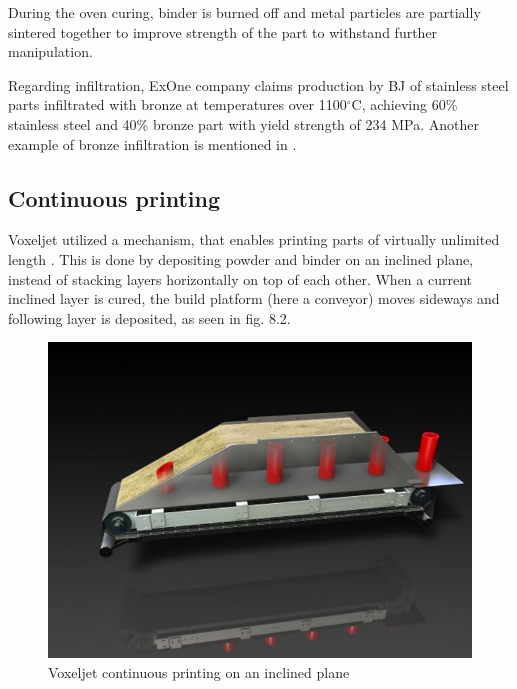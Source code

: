 \documentclass[a4paper, 11pt, reqno]{report}
\begin{document}
	During the oven curing, binder is burned off and metal particles are partially sintered together to improve strength of the part to withstand further manipulation.
	
	Regarding infiltration, ExOne company claims production by BJ of stainless steel parts infiltrated with bronze at temperatures over 1100$^{\circ}$C, achieving 60\% stainless steel and 40\% bronze part with yield strength of 234 MPa. Another example of bronze infiltration is mentioned in \cite{xometry}.

\newpage
\subsection{Continuous printing}
Voxeljet utilized a mechanism, that enables printing parts of virtually unlimited length \cite{voxeljet}. This is done by depositing powder and binder on an inclined plane, instead of stacking layers horizontally on top of each other. When a current inclined layer is cured, the build platform (here a conveyor) moves sideways and following layer is deposited, as seen in fig. 8.2.
\begin{figure}[h]
	\centering
	\includegraphics[scale=0.8]{3ders}
	\caption{Voxeljet continuous printing on an inclined plane \cite{3ders}}
\end{figure}
\end{document}

